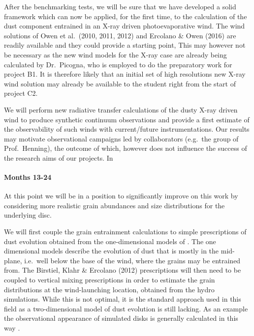 \documentclass[10pt,fleqn,twoside]{article}
\begin{document}
After the benchmarking tests, we will be sure that we have developed a
solid framework which can now be applied, for the
first time, to the calculation of the dust component entrained in an
X-ray driven photoevaporative wind. The wind solutions of Owen et
al.\ (2010, 2011, 2012) and Ercolano \& Owen (2016) are readily
available and they could provide a starting point,  This may however
not be necessary as the new wind models for the X-ray case
are already being calculated by Dr.\ Picogna, who is employed to do the
preparatory work for project B1. It is therefore likely that an
initial set of high resolutions new X-ray wind solution may already be
available to the student right from the start of project C2.
 

We will perform new radiative transfer calculations of the dusty
X-ray driven wind to produce synthetic continuum observations and
provide a first estimate of the observability of such winds with
current/future instrumentations. Our results may motivate
observational campaigns led by collaborators (e.g.\ the group of
Prof.\ Henning), the outcome of which, however does not influence the
success of the research aims of our projects. In

\paragraph{Months 13-24}
 
At this point we will be in a position to significantly improve on
this work by considering more realistic grain abundances and size
distributions for the underlying disc. 

We will first couple the grain entrainment calculations to simple
prescriptions of dust  evolution \citep[e.g.,][]{2012A&A...539A.148B}
obtained from the one-dimensional models of
\citet{2010A&A...513A..79B}. The one dimensional models describe the
evolution of dust that is mostly in the mid-plane, i.e.\ well below the
base of the wind, where the grains may be entrained from. The
Birstiel, Klahr \& Ercolano (2012) prescriptions will then need to be
coupled to vertical mixing prescriptions \citep{2009A&A...496..597F} in order to
estimate the grain distributions at the wind-launching location,
obtained from the hydro simulations. While this is not optimal, it is
the standard approach used in this field as a two-dimensional model of
dust evolution is still lacking. As an example the observational
appearance of simulated disks is generally calculated in this way
\citep[e.g.,][]{2015ApJ...813L..14B}. 
\end{document}
